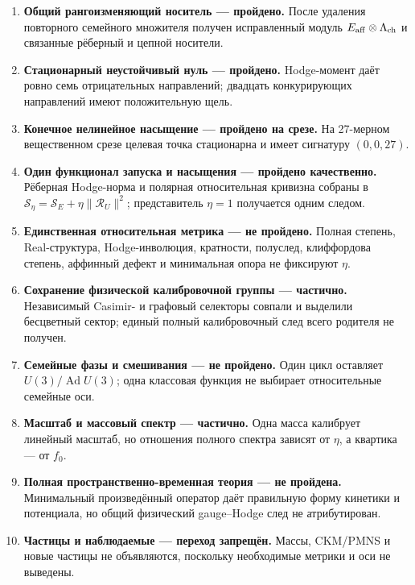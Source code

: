 \begin{enumerate}
 \item \textbf{Общий рангоизменяющий носитель --- пройдено.}
 После удаления повторного семейного множителя получен исправленный модуль
 $E_{\rm aff}\otimes\Lambda_{\rm ch}$ и связанные рёберный и цепной
 носители.

 \item \textbf{Стационарный неустойчивый нуль --- пройдено.}
 Hodge-момент даёт ровно семь отрицательных направлений; двадцать
 конкурирующих направлений имеют положительную щель.

 \item \textbf{Конечное нелинейное насыщение --- пройдено на срезе.}
 На 27-мерном вещественном срезе целевая точка стационарна и имеет
 сигнатуру $(0,0,27)$.

 \item \textbf{Один функционал запуска и насыщения --- пройдено
 качественно.} Рёберная Hodge-норма и полярная относительная кривизна
 собраны в $\mathcal S_\eta=\mathcal S_E+\eta\|\mathcal R_U\|^2$;
 представитель $\eta=1$ получается одним следом.

 \item \textbf{Единственная относительная метрика --- не пройдено.}
 Полная степень, Real-структура, Hodge-инволюция, кратности, полуслед,
 клиффордова степень, аффинный дефект и минимальная опора не фиксируют
 $\eta$.

 \item \textbf{Сохранение физической калибровочной группы --- частично.}
 Независимый Casimir- и графовый селекторы совпали и выделили бесцветный
 сектор; единый полный калибровочный след всего родителя не получен.

 \item \textbf{Семейные фазы и смешивания --- не пройдено.}
 Один цикл оставляет $U(3)/\operatorname{Ad}U(3)$; одна классовая функция
 не выбирает относительные семейные оси.

 \item \textbf{Масштаб и массовый спектр --- частично.}
 Одна масса калибрует линейный масштаб, но отношения полного спектра
 зависят от $\eta$, а квартика --- от $f_0$.

 \item \textbf{Полная пространственно-временная теория --- не пройдена.}
 Минимальный произведённый оператор даёт правильную форму кинетики и
 потенциала, но общий физический gauge--Hodge след не атрибутирован.

 \item \textbf{Частицы и наблюдаемые --- переход запрещён.}
 Массы, CKM/PMNS и новые частицы не объявляются, поскольку необходимые
 метрики и оси не выведены.
\end{enumerate}

